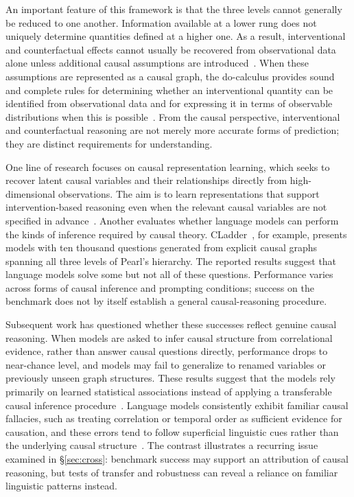 \documentclass[acmsmall,screen,review,anonymous]{acmart}
\begin{document}
An important feature of this framework is that the three levels cannot generally be reduced to one another. 
%
Information available at a lower rung does not uniquely determine quantities defined at a higher one. 
%
As a result, interventional and counterfactual effects cannot usually be recovered from observational data alone unless additional causal assumptions are introduced~\citep{bareinboim2022hierarchy}.
%
When these assumptions are represented as a causal graph, the do-calculus provides sound and complete rules for determining whether an interventional quantity can be identified from observational data and for expressing it in terms of observable distributions when this is possible~\citep{pearl2009}.  
%
From the causal perspective, interventional and counterfactual reasoning are not merely more accurate forms of prediction; they are distinct requirements for understanding.

One line of research focuses on causal representation learning, which seeks to recover latent causal variables and their relationships directly from high-dimensional observations. 
%
The aim is to learn representations that support intervention-based reasoning even when the relevant causal variables are not specified in advance~\citep{scholkopf2021}. 
%
Another evaluates whether language models can perform the kinds of inference required by causal theory. 
%
CLadder~\citep{jin2023cladder}, for example, presents models with ten thousand questions generated from explicit causal graphs spanning all three levels of Pearl's hierarchy. 
%
The reported results suggest that language models solve some but not all of these questions.
%
Performance varies across forms of causal inference and prompting conditions; success on the benchmark does not by itself establish a general causal-reasoning procedure.

Subsequent work has questioned whether these successes reflect genuine causal reasoning. 
%
When models are asked to infer causal structure from correlational evidence, rather than answer causal questions directly, performance drops to near-chance level, and models may fail to generalize to renamed variables or previously unseen graph structures.
%
These results suggest that the models rely primarily on learned statistical associations instead of applying a transferable causal inference procedure~\citep{jin2024largelanguagemodelsinfer}.
%
Language models consistently exhibit familiar causal fallacies, such as treating correlation or temporal order as sufficient evidence for causation, and these errors tend to follow superficial linguistic cues rather than the underlying causal structure~\citep{joshi-etal-2024-llms}.
%
The contrast illustrates a recurring issue examined in \S\ref{sec:cross}: benchmark success may support an attribution of causal reasoning, but tests of transfer and robustness can reveal a reliance on familiar linguistic patterns instead.
\end{document}
